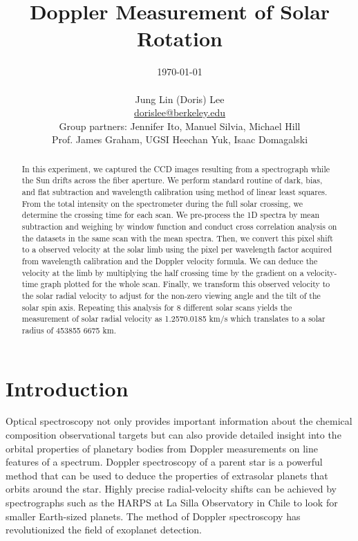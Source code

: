 \documentclass[authoryear, 12pt,5p, times]{elsarticle}
\newcommand{\rpm}{\raisebox{.3ex}{$\scriptstyle\pm$}}
\begin{document}
\begin{frontmatter}
\title{Doppler Measurement of Solar Rotation}
\author{\today \\ \quad \\Jung Lin (Doris) Lee\\  \href{mailto:dorislee@berkeley.edu}{dorislee@berkeley.edu} \\Group partners: Jennifer Ito, Manuel Silvia, Michael Hill\\Prof. James Graham, UGSI Heechan Yuk, Isaac Domagalski}
	\begin{abstract}
In this experiment, we captured the CCD images resulting from a spectrograph while the Sun drifts across the fiber aperture. We perform standard routine of dark, bias, and flat subtraction  and wavelength calibration using method of linear least squares. From the total intensity on the spectrometer during the full solar crossing, we determine the crossing time for each scan. We pre-process the 1D spectra by mean subtraction and weighing by window function and conduct cross correlation analysis on the datasets in the same scan with the mean spectra. Then, we convert this pixel shift to a observed velocity  at the solar limb using the pixel per wavelength factor acquired  from wavelength calibration and the Doppler velocity formula. We can deduce the velocity at the limb by multiplying the half crossing time by the gradient on a velocity-time graph plotted for the whole scan. Finally, we transform this observed velocity to the solar radial velocity to adjust for the non-zero viewing angle and the tilt of the solar spin axis. Repeating this analysis for 8 different solar scans yields the measurement of solar radial velocity as 1.257\rpm 0.0185 km/s  which translates to a solar radius of 453855 \rpm 6675 km.
	\end{abstract}
\end{frontmatter}
\section{Introduction}
Optical spectroscopy not only provides important information about the chemical composition observational targets but can also provide detailed insight into the orbital properties of planetary bodies from Doppler measurements on line features of a spectrum. Doppler spectroscopy of a parent star is a powerful method that can be used to deduce the properties of extrasolar planets that orbits around the star. Highly precise radial-velocity shifts can be achieved by  spectrographs such as the HARPS at La Silla Observatory in Chile to  look for smaller Earth-sized planets. The method of Doppler spectroscopy has revolutionized the field of exoplanet detection. 
\end{document}

